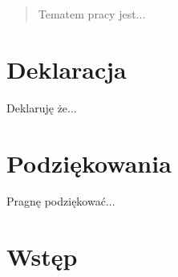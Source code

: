 \documentclass[a4paper, 11pt]{report}
\begin{document}



\begin{abstract}
Tematem pracy jest...
\end{abstract}
 
\chapter*{Deklaracja}
Deklaruję że...
 
\chapter*{Podziękowania}
Pragnę podziękować...
 
\tableofcontents

\newpage
{}

\chapter{Wstęp}


\listoffigures
\listoftables
\listoflistings

\nocite{*}


\end{document}
